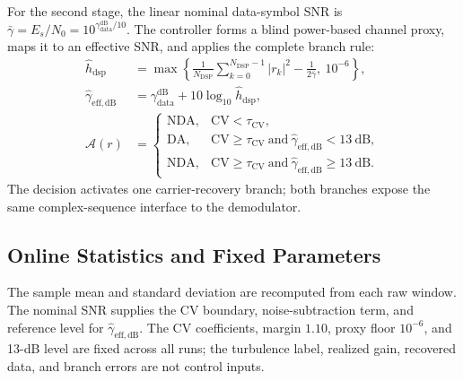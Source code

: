 For the second stage, the linear nominal data-symbol SNR is $\bar\gamma=E_s/N_0=10^{\gamma_{\mathrm{data}}^{\mathrm{dB}}/10}$. The controller forms a blind power-based channel proxy, maps it to an effective SNR, and applies the complete branch rule:
\begin{equation}
\begin{aligned}
\hat h_{\mathrm{dsp}}
&=\max\!\left\{
\frac{1}{N_{\mathrm{DSP}}}\sum_{k=0}^{N_{\mathrm{DSP}}-1}|r_k|^2
-\frac{1}{2\bar\gamma},\ 10^{-6}
\right\},\\
\hat\gamma_{\mathrm{eff,dB}}
&=\gamma_{\mathrm{data}}^{\mathrm{dB}}+10\log_{10}\hat h_{\mathrm{dsp}},\\
\mathcal A(r)
&=\begin{cases}
\mathrm{NDA}, & \mathrm{CV}<\tau_{\mathrm{CV}},\\
\mathrm{DA}, & \mathrm{CV}\ge\tau_{\mathrm{CV}}
\ \text{and}\ \hat\gamma_{\mathrm{eff,dB}}<13~\mathrm{dB},\\
\mathrm{NDA}, & \mathrm{CV}\ge\tau_{\mathrm{CV}}
\ \text{and}\ \hat\gamma_{\mathrm{eff,dB}}\ge13~\mathrm{dB}.
\end{cases}
\end{aligned}
\label{eq:two-stage-switch}
\end{equation}
The decision activates one carrier-recovery branch; both branches expose the same complex-sequence interface to the demodulator.

\subsection{Online Statistics and Fixed Parameters}

The sample mean and standard deviation are recomputed from each raw window. The nominal SNR supplies the CV boundary, noise-subtraction term, and reference level for $\hat\gamma_{\mathrm{eff,dB}}$. The CV coefficients, margin $1.10$, proxy floor $10^{-6}$, and 13-dB level are fixed across all runs; the turbulence label, realized gain, recovered data, and branch errors are not control inputs.
